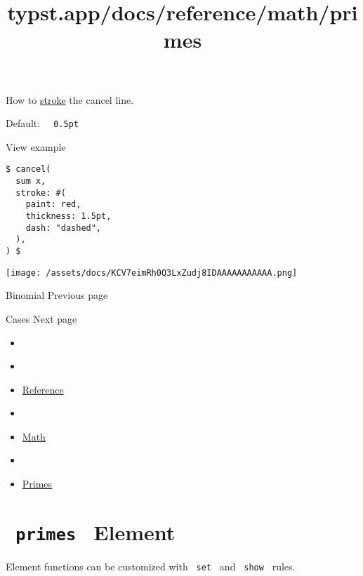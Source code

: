 How to \href{/docs/reference/visualize/stroke/}{stroke} the cancel line.

Default: \texttt{\ }{\texttt{\ 0.5pt\ }}\texttt{\ }


View example

\begin{verbatim}
$ cancel(
  sum x,
  stroke: #(
    paint: red,
    thickness: 1.5pt,
    dash: "dashed",
  ),
) $
\end{verbatim}

\texttt{[image: /assets/docs/KCV7eimRh0Q3LxZudj8IDAAAAAAAAAAA.png]}

\href{/docs/reference/math/binom/}{\pandocbounded{}}

{ Binomial } { Previous page }

\href{/docs/reference/math/cases/}{\pandocbounded{}}

{ Cases } { Next page }


\title{typst.app/docs/reference/math/primes}

\begin{itemize}
\tightlist
\item
  \href{/docs}{}
\item
  
\item
  \href{/docs/reference/}{Reference}
\item
  
\item
  \href{/docs/reference/math/}{Math}
\item
  
\item
  \href{/docs/reference/math/primes/}{Primes}
\end{itemize}

\section{\texorpdfstring{\texttt{\ primes\ } {{ Element
}}}{ primes   Element }}\label{summary}

\label{element-tooltip}
Element functions can be customized with \texttt{\ set\ } and
\texttt{\ show\ } rules.

